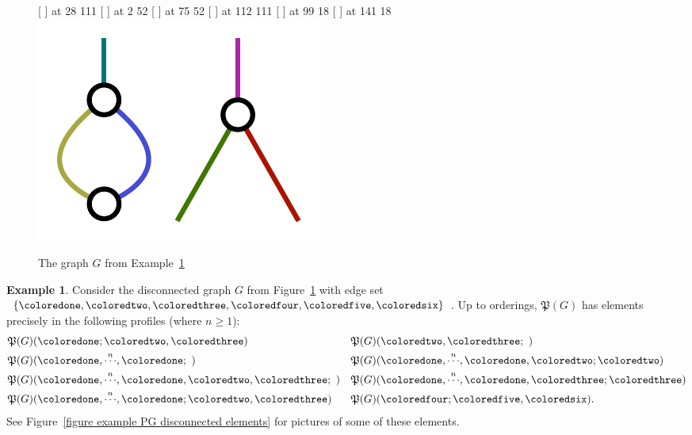 \documentclass{amsart}
\numberwithin{theorem}{subsection}
\theoremstyle{definition}
\newtheorem{example}[theorem]{Example}
\begin{document}
\begin{figure}[htb]
\small\hair 2pt
  [ ] at 28 111
  [ ] at 2 52
  [ ] at 75 52
  [ ] at 112 111
  [ ] at 99 18
  [ ] at 141 18
\endlabellist
\centering
\includegraphics[scale=0.75]{disconnected_graph}
\caption{The graph $G$ from Example~\ref{example PG disconnected}}
\label{figure example PG disconnected}
\end{figure}

\begin{example}\label{example PG disconnected}
Consider the disconnected graph $G$ from Figure~\ref{figure example PG disconnected} with edge set $\{\coloredone,\coloredtwo,\coloredthree,\coloredfour,\coloredfive,\coloredsix\}$.
Up to orderings, $\mathfrak{P}(G)$ has elements precisely in the following profiles (where $n\geq 1$):
\begin{align*}
&\mathfrak{P}(G)(\coloredone; \coloredtwo, \coloredthree)  && \mathfrak{P}(G)(\coloredtwo, \coloredthree; \,\,) \\
&\mathfrak{P}(G)(\coloredone, \overset{n}{\cdots}, \coloredone; \,\,)  && \mathfrak{P}(G)(\coloredone, \overset{n}{\cdots}, \coloredone, \coloredtwo; \coloredtwo) \\
& \mathfrak{P}(G)(\coloredone, \overset{n}{\cdots}, \coloredone, \coloredtwo, \coloredthree;\,\,) && \mathfrak{P}(G)(\coloredone, \overset{n}{\cdots}, \coloredone, \coloredthree; \coloredthree) \\
& \mathfrak{P}(G)(\coloredone, \overset{n}{\cdots}, \coloredone; \coloredtwo, \coloredthree)  && \mathfrak{P}(G)(\coloredfour; \coloredfive, \coloredsix).
\end{align*}
See Figure~\ref{figure example PG disconnected elements} for pictures of some of these elements.
\end{example}
\end{document}
